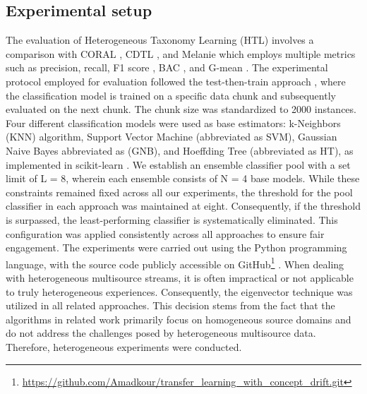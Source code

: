 \subsection{Experimental setup}
The evaluation of Heterogeneous Taxonomy Learning (HTL) involves a comparison with CORAL \cite{sun2016return}, CDTL \cite{yang2021concept}, and Melanie \cite{dong2019multistream}  which employs multiple metrics such as precision, recall, F1 score \cite{sasaki2007truth}, BAC \cite{brodersen2010balanced}, and G-mean \cite{kubat1997addressing}. The experimental protocol employed for evaluation followed the test-then-train approach \cite{krawczyk2017ensemble}, where the classification model is trained on a specific data chunk and subsequently evaluated on the next chunk. The chunk size was standardized to 2000 instances. Four different classification models were used as base estimators: k-Neighbors (KNN) algorithm, Support Vector Machine (abbreviated as SVM), Gaussian Naive Bayes abbreviated as (GNB), and Hoeffding Tree (abbreviated as HT), as implemented in scikit-learn \cite{frias2014online}. We establish an ensemble classifier pool with a set limit of L = 8, wherein each ensemble consists of N = 4 base models. While these constraints remained fixed across all our experiments, the threshold for the pool classifier in each approach was maintained at eight. Consequently, if the threshold is surpassed, the least-performing classifier is systematically eliminated. This configuration was applied consistently across all approaches to ensure fair engagement. The experiments were carried out using the Python programming language, with the source code publicly accessible on GitHub\footnote{\url{https://github.com/Amadkour/transfer_learning_with_concept_drift.git}} . When dealing with heterogeneous multisource streams, it is often impractical or not applicable to truly heterogeneous experiences. Consequently, the eigenvector technique was utilized in all related approaches. This decision stems from the fact that the algorithms in related work primarily focus on homogeneous source domains and do not address the challenges posed by heterogeneous multisource data. Therefore, heterogeneous experiments were conducted.


